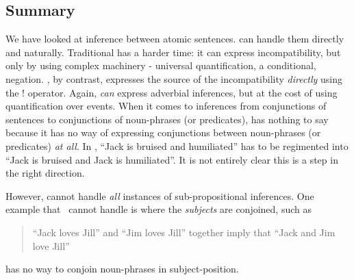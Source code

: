 \subsection{Summary}
We have looked at inference between atomic sentences. \Cathoristic{}
can handle them directly and naturally.  Traditional \fol{} has a
harder time: it can express incompatibility, but only by using
complex machinery - universal quantification, a conditional,
negation. \Cathoristic{}, by contrast, expresses the source of the
incompatibility \emph{directly} using the $!$ operator.  Again, \fol{}
\emph{can} express adverbial inferences, but at the cost of using
quantification over events.  When it comes to inferences from
conjunctions of sentences to conjunctions of noun-phrases (or
predicates), \fol{} has nothing to say because it has no way of
expressing conjunctions between noun-phrases (or predicates) \emph{at
  all}. In \fol{}, ``Jack is bruised and humiliated'' has to be
regimented into ``Jack is bruised and Jack is humiliated''.  
It is not entirely clear this is a step in the right direction.

However, \cathoristic{} cannot handle \emph{all} instances of
sub-propositional inferences.  
One example that \cathoristic\ cannot handle is where the
\emph{subjects} are conjoined, such as
\begin{quote}
``Jack loves Jill'' and ``Jim loves Jill'' together imply that ``Jack and Jim love Jill''
\end{quote}

\NI \Cathoristic{} has no way to conjoin noun-phrases in subject-position.
